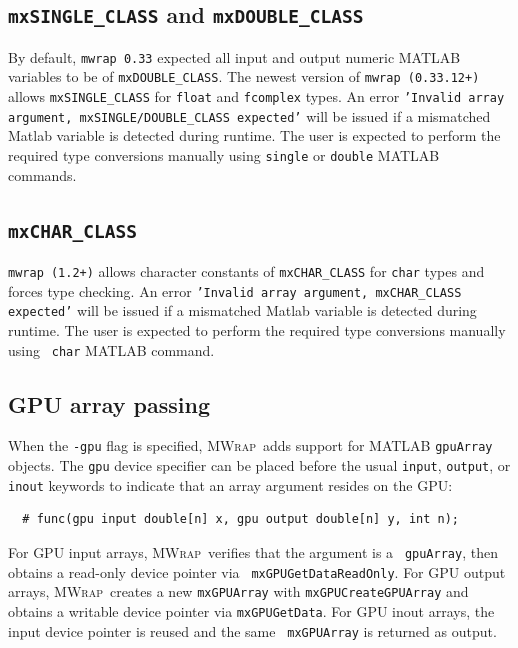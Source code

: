 \documentclass[12pt]{article}
\newcommand{\mwrap}{\textsc{MWrap}}
\begin{document}
\subsection{{\tt mxSINGLE\_CLASS} and {\tt mxDOUBLE\_CLASS}}

By default, {\tt mwrap 0.33} expected all input and output numeric
MATLAB variables to be of {\tt mxDOUBLE\_CLASS}. The newest version of
{\tt mwrap (0.33.12+)} allows {\tt mxSINGLE\_CLASS} for {\tt float}
and {\tt fcomplex} types. An error {\tt 'Invalid array argument,
  mxSINGLE/DOUBLE\_CLASS expected'} will be issued if a mismatched
Matlab variable is detected during runtime. The user is expected to
perform the required type conversions manually using {\tt single} or
{\tt double} MATLAB commands.

\subsection{{\tt mxCHAR\_CLASS}}

{\tt mwrap (1.2+)} allows character constants of {\tt mxCHAR\_CLASS}
for {\tt char} types and forces type checking. An error {\tt 'Invalid
  array argument, mxCHAR\_CLASS expected'} will be issued if a
mismatched Matlab variable is detected during runtime. The user is
expected to perform the required type conversions manually using {\tt
  char} MATLAB command.


\subsection{GPU array passing}
\label{gpu-section}

When the {\tt -gpu} flag is specified, \mwrap\ adds support for
MATLAB {\tt gpuArray} objects.  The {\tt gpu} device specifier can be
placed before the usual {\tt input}, {\tt output}, or {\tt inout}
keywords to indicate that an array argument resides on the GPU:
\begin{verbatim}
  # func(gpu input double[n] x, gpu output double[n] y, int n);
\end{verbatim}

For GPU input arrays, \mwrap\ verifies that the argument is a {\tt
  gpuArray}, then obtains a read-only device pointer via {\tt
  mxGPUGetDataReadOnly}.  For GPU output arrays, \mwrap\ creates a
new {\tt mxGPUArray} with {\tt mxGPUCreateGPUArray} and obtains a
writable device pointer via {\tt mxGPUGetData}.  For GPU inout
arrays, the input device pointer is reused and the same {\tt
  mxGPUArray} is returned as output.
\end{document}
